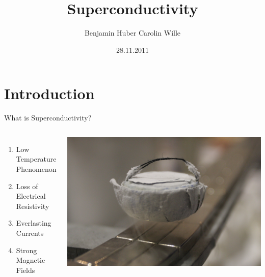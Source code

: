 \documentclass{beamer}
\begin{document}
\title{Superconductivity}   
\author{Benjamin Huber \qquad Carolin Wille} 
\date{28.11.2011}

\begin{frame}
\titlepage
\end{frame}




\section{Introduction} %


\begin{frame}{What is Superconductivity?}
\begin{columns}
        \begin{enumerate}[<+->]
\item Low Temperature Phenomenon
\item Loss of Electrical Resistivity 
\item Everlasting Currents
\item Strong Magnetic Fields
\end{enumerate}
                
        \includegraphics[width=\textwidth]{img/levitation2.jpg}
\end{columns}
\end{frame}
\end{document}
